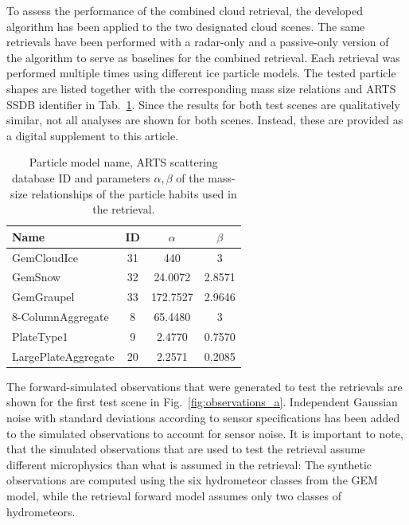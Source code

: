 \documentclass[journal abbreviation, manuscript]{copernicus}
\begin{document}
To assess the performance of the combined cloud retrieval, the developed
algorithm has been applied to the two designated cloud scenes. The same
retrievals have been performed with a radar-only and a passive-only version of
the algorithm to serve as baselines for the combined retrieval. Each retrieval
was performed multiple times using different ice particle models. The tested
particle shapes are listed together with the corresponding mass size relations
and ARTS SSDB identifier in Tab.~\ref{tab:particles_retrieval}. Since the
results for both test scenes are qualitatively similar, not all analyses are
shown for both scenes. Instead, these are provided as a digital supplement to
this article.

\begin{table}
  \centering
  \caption{Particle model name, ARTS scattering database ID and parameters
    $\alpha, \beta$ of the mass-size relationships of the particle habits used
    in the retrieval.}
  \begin{tabular}{l|c|c|c}
    Name & ID & $\alpha$ & $\beta$ \\
    \hline
    GemCloudIce         & 31  & 440      & 3 \\
    GemSnow             & 32  & 24.0072  & 2.8571 \\
    GemGraupel          & 33  & 172.7527 & 2.9646 \\
    8-ColumnAggregate   &  8  & 65.4480  & 3      \\
    PlateType1          &  9  & 2.4770   & 0.7570 \\
    LargePlateAggregate &  20 & 2.2571   & 0.2085 \\
  \end{tabular}
  \label{tab:particles_retrieval}
\end{table}

The forward-simulated observations that were generated to test the retrievals
are shown for the first test scene in Fig.~\ref{fig:observations_a}. Independent
Gaussian noise with standard deviations according to sensor specifications has
been added to the simulated observations to account for sensor noise. It is
important to note, that the simulated observations that are used to test the
retrieval assume different microphysics than what is assumed in the retrieval:
The synthetic observations are computed using the six hydrometeor classes from
the GEM model, while the retrieval forward model assumes only two classes of
hydrometeors.
\end{document}
